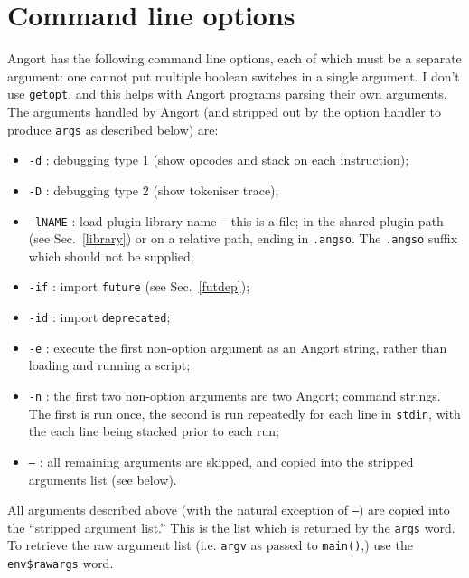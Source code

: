 \section{Command line options}
Angort has the following command line options, each of which must be
a separate argument: one cannot put multiple boolean switches
in a single argument. I don't use \texttt{getopt}, and this helps
with Angort programs parsing their own arguments.
The arguments handled by Angort (and stripped out by the option handler
to produce \texttt{args} as described below) are:
\begin{itemize}
\item \texttt{-d} : debugging type 1 (show opcodes and stack on each instruction);
\item \texttt{-D} : debugging type 2 (show tokeniser trace);
\item \texttt{-lNAME} : load plugin library name -- this is a file;
in the shared plugin path (see Sec.~\ref{library}) or on a relative path, ending in
\texttt{.angso}. The \texttt{.angso} suffix which should not be supplied;
\item \texttt{-if} : import \texttt{future} (see Sec.~\ref{futdep});
\item \texttt{-id} : import \texttt{deprecated};
\item \texttt{-e} : execute the first non-option argument as an
Angort string, rather than loading and running a script;
\item \texttt{-n} : the first two non-option arguments are two Angort;
command strings. The first is run once, the second is run repeatedly
for each line in \texttt{stdin}, with the each line being stacked
prior to each run;
\item \texttt{--} : all remaining arguments are skipped, and copied
into the stripped arguments list (see below).
\end{itemize}
All arguments described above (with the natural exception of \texttt{--})
are copied into the ``stripped argument list.'' This is the list
which is returned by the \texttt{args} word. To retrieve the raw
argument list (i.e. \texttt{argv} as passed to \texttt{main()},) use
the \texttt{env\$rawargs} word.



\clearpage
